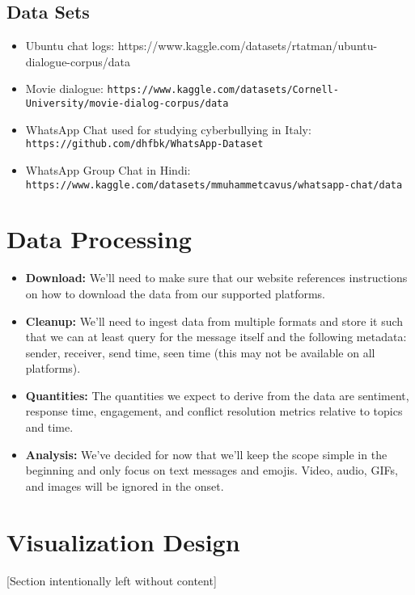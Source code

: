 \documentclass{article}\usepackage{graphicx}
\begin{document}
\subsection*{Data Sets}
\begin{itemize}
    \item Ubuntu chat logs: https://www.kaggle.com/datasets/rtatman/ubuntu-dialogue-corpus/data
    \item Movie dialogue: \texttt{https://www.kaggle.com/datasets/Cornell-University/movie-dialog-corpus/data}
    \item WhatsApp Chat used for studying cyberbullying in Italy: \texttt{https://github.com/dhfbk/WhatsApp-Dataset}
    \item WhatsApp Group Chat in Hindi: \texttt{https://www.kaggle.com/datasets/mmuhammetcavus/whatsapp-chat/data}
\end{itemize}

\section*{Data Processing}
\begin{itemize}
    \item \textbf{Download:} We'll need to make sure that our website references instructions on how to download the data from our supported platforms.
    \item \textbf{Cleanup:} We'll need to ingest data from multiple formats and store it such that we can at least query for the message itself and the following metadata: sender, receiver, send time, seen time (this may not be available on all platforms).
    \item \textbf{Quantities:} The quantities we expect to derive from the data are sentiment, response time, engagement, and conflict resolution metrics relative to topics and time.
    \item \textbf{Analysis:} We've decided for now that we'll keep the scope simple in the beginning and only focus on text messages and emojis. Video, audio, GIFs, and images will be ignored in the onset.
\end{itemize}

\section*{Visualization Design}
[Section intentionally left without content]
\end{document}
